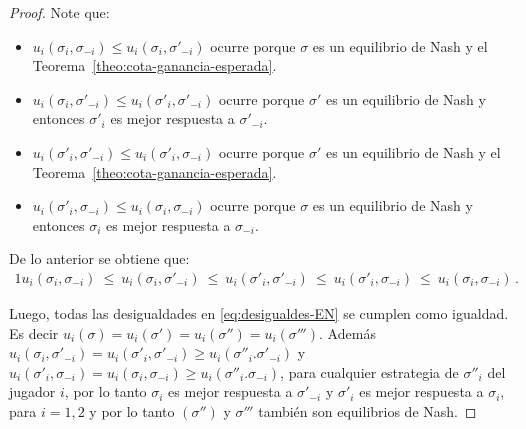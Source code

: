 \begin{proof}

Note que:
\begin{itemize}
    \item $u_i(\sigma_i, \sigma_{-i}) \leq u_i(\sigma_i, \sigma'_{-i})$ ocurre porque $\sigma$ es un equilibrio de Nash y el Teorema~\ref{theo:cota-ganancia-esperada}.
    \item $u_i(\sigma_i, \sigma'_{-i}) \leq u_i(\sigma'_i, \sigma'_{-i})$ ocurre porque $\sigma'$ es un equilibrio de Nash y entonces $\sigma'_i$ es mejor respuesta a $\sigma'_{-i}$.
    \item  $u_i(\sigma'_i, \sigma'_{-i}) \leq u_i(\sigma'_i, \sigma_{-i})$ ocurre porque $\sigma'$ es un equilibrio de Nash y el Teorema~\ref{theo:cota-ganancia-esperada}.
    \item $u_i(\sigma'_i, \sigma_{-i}) \leq u_i(\sigma_i, \sigma_{-i})$ ocurre porque $\sigma$ es un equilibrio de Nash y entonces $\sigma_i$ es mejor respuesta a $\sigma_{-i}$.
\end{itemize}

De lo anterior se obtiene que:
\begin{alignat}{1}
\label{eq:desigualdes-EN}
u_i(\sigma_i, \sigma_{-i})\ \leq\ u_i(\sigma_i, \sigma'_{-i})\ \leq\ u_i(\sigma'_i, \sigma'_{-i})\ \leq\ u_i(\sigma'_i, \sigma_{-i})\ \leq\ u_i(\sigma_i, \sigma_{-i}) \,.
\end{alignat}


Luego, todas las desigualdades en \ref{eq:desigualdes-EN} se cumplen como igualdad. Es decir $u_i(\sigma) = u_i(\sigma') = u_i(\sigma'') = u_i(\sigma''')$. Además $u_i(\sigma_i, \sigma'_{-i}) = u_i(\sigma'_i, \sigma'_{-i}) \geq u_i(\sigma''_i. \sigma'_{-i})$ y $u_i(\sigma'_i, \sigma_{-i}) = u_i(\sigma_i, \sigma_{-i}) \geq u_i(\sigma''_i. \sigma_{-i})$, para cualquier estrategia de $\sigma''_i$ del jugador $i$, por lo tanto $\sigma_i$ es mejor respuesta a $\sigma'_{-i}$ y $\sigma'_{i}$ es mejor respuesta a $\sigma_{i}$, para $i = 1, 2$ y por lo tanto $(\sigma'')$ y $\sigma'''$ también son equilibrios de Nash.
\end{proof}

